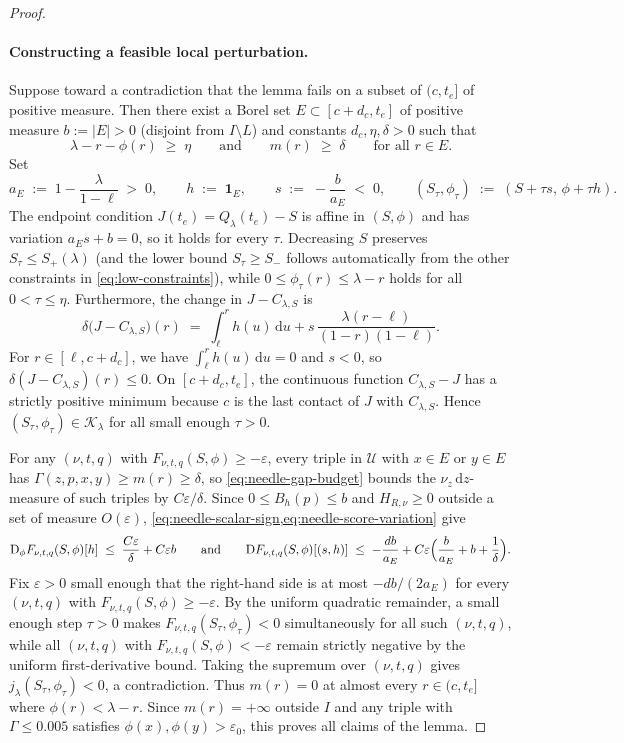 \documentclass[11pt]{article}
\numberwithin{equation}{section}
\theoremstyle{plain}
\theoremstyle{definition}
\newcommand{\1}{\mathbf{1}}
\newcommand{\calK}{\mathcal{K}}
\newcommand{\calU}{\mathcal{U}}
\begin{document}
\begin{proof}
\paragraph{Constructing a feasible local perturbation.}
Suppose toward a contradiction that the lemma fails on a subset of $(c, t_e]$ of positive measure. Then there exist a Borel set $E \subset [c + d_c, t_e]$ of positive measure $b := |E| > 0$ (disjoint from $I \setminus L$) and constants $d_c, \eta, \delta > 0$ such that
\[
  \lambda - r - \phi(r) \;\ge\; \eta
  \qquad\text{and}\qquad
  m(r) \;\ge\; \delta
  \qquad\text{for all } r \in E.
\]
Set
\[
  a_E \;:=\; 1 - \frac{\lambda}{1 - \ell} \;>\; 0,
  \qquad
  h \;:=\; \1_E,
  \qquad
  s \;:=\; -\frac{b}{a_E} \;<\; 0,
  \qquad
  (S_\tau, \phi_\tau) \;:=\; (S + \tau s,\, \phi + \tau h).
\]
The endpoint condition $J(t_e) = Q_\lambda(t_e) - S$ is affine in $(S, \phi)$ and has variation $a_E s + b = 0$, so it holds for every $\tau$. Decreasing $S$ preserves $S_\tau \le S_+(\lambda)$ (and the lower bound $S_\tau \ge S_-$ follows automatically from the other constraints in \cref{eq:low-constraints}), while $0 \le \phi_\tau(r) \le \lambda - r$ holds for all $0 < \tau \le \eta$. Furthermore, the change in $J - C_{\lambda, S}$ is
\[
  \delta\bigl(J - C_{\lambda, S}\bigr)(r) \;=\; \int_\ell^r h(u)\,\mathrm{d}u + s\,\frac{\lambda(r - \ell)}{(1 - r)(1 - \ell)}.
\]
For $r \in [\ell, c + d_c]$, we have $\int_\ell^r h(u)\,\mathrm{d}u = 0$ and $s < 0$, so $\delta(J - C_{\lambda, S})(r) \le 0$. On $[c + d_c, t_e]$, the continuous function $C_{\lambda, S} - J$ has a strictly positive minimum because $c$ is the last contact of $J$ with $C_{\lambda, S}$. Hence $(S_\tau, \phi_\tau) \in \calK_\lambda$ for all small enough $\tau > 0$.

For any $(\nu, t, q)$ with $F_{\nu, t, q}(S, \phi) \ge -\varepsilon$, every triple in $\calU$ with $x \in E$ or $y \in E$ has $\Gamma(z, p, x, y) \ge m(r) \ge \delta$, so \cref{eq:needle-gap-budget} bounds the $\nu_z\,\mathrm{d}z$-measure of such triples by $C\varepsilon/\delta$. Since $0 \le B_h(p) \le b$ and $H_{R, \nu} \ge 0$ outside a set of measure $O(\varepsilon)$, \cref{eq:needle-scalar-sign,eq:needle-score-variation} give
\[
  \mathrm{D}_\phi F_{\nu, t, q}(S, \phi)[h] \;\le\; \frac{C\varepsilon}{\delta} + C\varepsilon b
  \qquad\text{and}\qquad
  \mathrm{D}F_{\nu, t, q}(S, \phi)[(s, h)] \;\le\; -\frac{d b}{a_E} + C\varepsilon\Bigl(\frac{b}{a_E} + b + \frac{1}{\delta}\Bigr).
\]
Fix $\varepsilon > 0$ small enough that the right-hand side is at most $-d b/(2a_E)$ for every $(\nu, t, q)$ with $F_{\nu, t, q}(S, \phi) \ge -\varepsilon$. By the uniform quadratic remainder, a small enough step $\tau > 0$ makes $F_{\nu, t, q}(S_\tau, \phi_\tau) < 0$ simultaneously for all such $(\nu, t, q)$, while all $(\nu, t, q)$ with $F_{\nu, t, q}(S, \phi) < -\varepsilon$ remain strictly negative by the uniform first-derivative bound. Taking the supremum over $(\nu, t, q)$ gives $j_\lambda(S_\tau, \phi_\tau) < 0$, a contradiction. Thus $m(r) = 0$ at almost every $r \in (c, t_e]$ where $\phi(r) < \lambda - r$. Since $m(r) = +\infty$ outside $I$ and any triple with $\Gamma \le 0.005$ satisfies $\phi(x), \phi(y) > \varepsilon_0$, this proves all claims of the lemma.
\end{proof}
\end{document}
